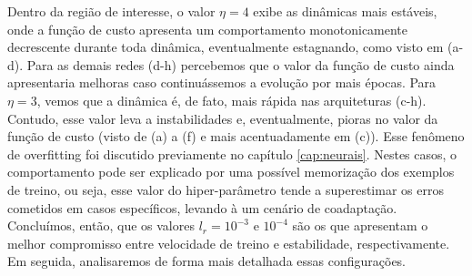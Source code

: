 Dentro da região de interesse, o valor $\eta = 4$ exibe as dinâmicas mais estáveis, onde a função de custo apresenta um comportamento monotonicamente decrescente durante toda dinâmica, eventualmente estagnando, como visto em (a-d). Para as demais redes (d-h) percebemos que o valor da função de custo ainda apresentaria melhoras caso continuássemos a evolução por mais épocas. Para $\eta = 3$, vemos que a dinâmica é, de fato, mais rápida nas arquiteturas (c-h). Contudo, esse valor leva a instabilidades e, eventualmente, pioras no valor da função de custo (visto de (a) a (f) e mais acentuadamente em (c)). Esse fenômeno de overfitting foi discutido previamente no capítulo \ref{cap:neurais}. Nestes casos, o comportamento pode ser explicado por uma possível memorização dos exemplos de treino, ou seja, esse valor do hiper-parâmetro tende a superestimar os erros cometidos em casos específicos, levando à um cenário de coadaptação. Concluímos, então, que os valores $l_r=10^{-3}$ e $10^{-4}$ são os que apresentam o melhor compromisso entre velocidade de treino e estabilidade, respectivamente. Em seguida, analisaremos de forma mais detalhada essas configurações. 


